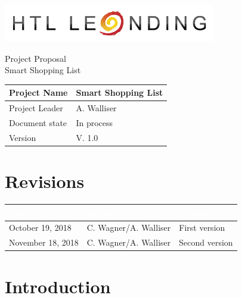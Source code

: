 \documentclass[12pt]{article}
\theoremstyle{definition}
\newcommand{\projectname}{Smart Shopping List}
\newcommand{\productname}{Smart Shopping List}
\newcommand{\projectleader}{A. Walliser}
\newcommand{\documentstatus}{In process}
\newcommand{\version}{V. 1.0}
\begin{document}
\begin{titlepage}
\begin{flushright}
\includegraphics[scale=.5]{htlleondinglogo.png}\\
\end{flushright}

\vspace{10em}

\begin{center}
{\Huge Project Proposal} \\[3em]
{\LARGE \productname} \\[3em]
\end{center}

\begin{flushleft}
\begin{tabular}{|l|l|}
\hline
Project Name & \projectname \\ \hline
Project Leader & \projectleader \\ \hline
Document state & \documentstatus \\ \hline
Version & \version \\ \hline
\end{tabular}
\end{flushleft}

\end{titlepage}
\section*{Revisions}
\begin{tabular}{|l|l|l|}
\hline
\cellcolor[gray]{0.5}\textcolor{white}{Date} & \cellcolor[gray]{0.5}\textcolor{white}{Author} & \cellcolor[gray]{0.5}\textcolor{white}{Change} \\ \hline
October 19, 2018&C. Wagner/A. Walliser&First version \\ \hline
November 18, 2018&C. Wagner/A. Walliser&Second version \\ \hline
\end{tabular}
\pagebreak

\tableofcontents
\pagebreak

\section{Introduction}
\end{document}
